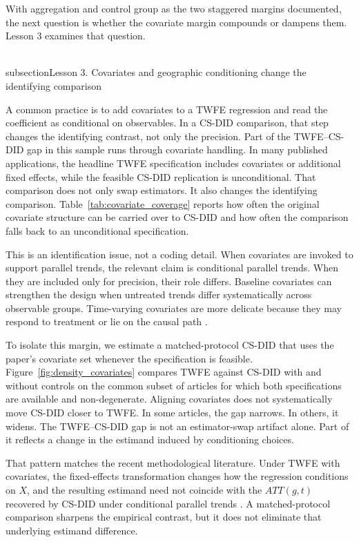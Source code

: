\documentclass[11pt]{article}
\begin{document}
With aggregation and control group as the two staggered margins documented, the next question is whether the covariate margin compounds or dampens them. Lesson 3 examines that question.






\newpage
\\subsection{Lesson 3. Covariates and geographic conditioning change the identifying comparison}

A common practice is to add covariates to a TWFE regression and read the coefficient as conditional on observables. In a CS-DID comparison, that step changes the identifying contrast, not only the precision. Part of the TWFE--CS-DID gap in this sample runs through covariate handling. In many published applications, the headline TWFE specification includes covariates or additional fixed effects, while the feasible CS-DID replication is unconditional. That comparison does not only swap estimators. It also changes the identifying comparison. Table~\ref{tab:covariate_coverage} reports how often the original covariate structure can be carried over to CS-DID and how often the comparison falls back to an unconditional specification.

This is an identification issue, not a coding detail. When covariates are invoked to support parallel trends, the relevant claim is conditional parallel trends. When they are included only for precision, their role differs. Baseline covariates can strengthen the design when untreated trends differ systematically across observable groups. Time-varying covariates are more delicate because they may respond to treatment or lie on the causal path \parencite{caetano2022difference,caetano_callaway2024_hiddenlinearity}.

To isolate this margin, we estimate a matched-protocol CS-DID that uses the paper's covariate set whenever the specification is feasible. Figure~\ref{fig:density_covariates} compares TWFE against CS-DID with and without controls on the common subset of articles for which both specifications are available and non-degenerate. Aligning covariates does not systematically move CS-DID closer to TWFE. In some articles, the gap narrows. In others, it widens. The TWFE--CS-DID gap is not an estimator-swap artifact alone. Part of it reflects a change in the estimand induced by conditioning choices.

That pattern matches the recent methodological literature. Under TWFE with covariates, the fixed-effects transformation changes how the regression conditions on \(X\), and the resulting estimand need not coincide with the \(ATT(g,t)\) recovered by CS-DID under conditional parallel trends \parencite{callaway2021difference,caetano2022difference,caetano_callaway2024_hiddenlinearity,wooldridge2025two}. A matched-protocol comparison sharpens the empirical contrast, but it does not eliminate that underlying estimand difference.
\end{document}
